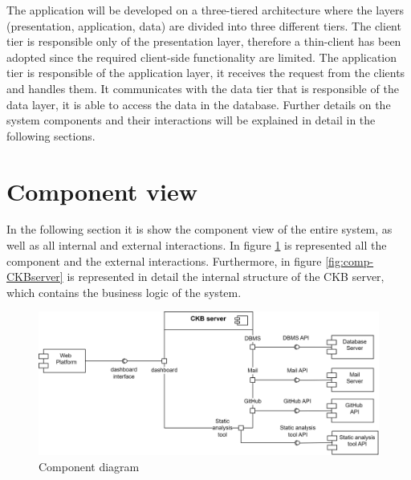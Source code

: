 The application will be developed on a three-tiered architecture where the layers (presentation, application, data) are divided into three different tiers. \newline
The client tier is responsible only of the presentation layer, therefore a thin-client has been adopted since the required client-side functionality are limited. The application tier is responsible of the application layer, it receives the request from the clients and handles them. It communicates with the data tier that is responsible of the data layer, it is able to access the data in the database. \newline
Further details on the system components and their interactions will be explained in detail in the following sections.
\clearpage

\section{Component view}
In the following section it is show the component view of the entire system, as well as all internal and external interactions. \newline
In figure \ref{fig:comp-hl} is represented all the component and the external interactions. Furthermore, in figure \ref{fig:comp-CKBserver} is represented in detail the internal structure of the CKB server, which contains the business logic of the system.

\begin{figure}[h]
    \centering
    \includegraphics[width=\textwidth]{images/component-hl.png}
    \caption{Component diagram}
    \label{fig:comp-hl}
\end{figure}

